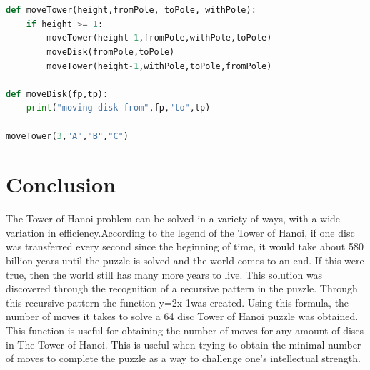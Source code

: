 \documentclass[11pt]{article}            %
\begin{document}
\begin{lstlisting}[language=Python]

 
def moveTower(height,fromPole, toPole, withPole):
    if height >= 1:
        moveTower(height-1,fromPole,withPole,toPole)
        moveDisk(fromPole,toPole)
        moveTower(height-1,withPole,toPole,fromPole)

def moveDisk(fp,tp):
    print("moving disk from",fp,"to",tp)

moveTower(3,"A","B","C")
\end{lstlisting}

\section{Conclusion}  
The Tower of Hanoi problem can be solved in a variety of ways, with a wide variation in efficiency.According to the legend of the Tower of Hanoi, if one disc was
transferred every second since the beginning of time, it would take about
580 billion years until the puzzle is solved and the world comes to an end.
If this were true, then the world still has many more years to live.
This solution was discovered through the recognition of a recursive
pattern in the puzzle. Through this recursive pattern the function
y=2x-1was created. Using this formula, the number of moves it takes to
solve a 64 disc Tower of Hanoi puzzle was obtained. This function is
useful for obtaining the number of moves for any amount of discs in The
Tower of Hanoi. This is useful when trying to obtain the minimal number
of moves to complete the puzzle as a way to challenge one’s intellectual
strength.


 
\end{document}
